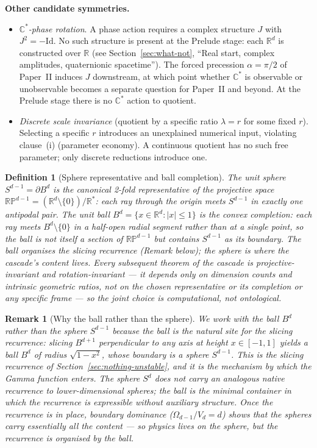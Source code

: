 \documentclass[11pt,a4paper]{article}
\newtheorem{definition}[theorem]{Definition}
\newtheorem{remark}[theorem]{Remark}
\begin{document}
\noindent\textbf{Other candidate symmetries.}
\begin{itemize}
\item \emph{$\mathbb{C}^*$-phase rotation}. A phase action requires a
complex structure $J$ with $J^2=-\mathrm{Id}$. No such structure is
present at the Prelude stage: each $\mathbb{R}^d$ is constructed over
$\mathbb{R}$ (see Section~\ref{sec:what-not}, ``Real start, complex
amplitudes, quaternionic spacetime''). The forced precession
$\alpha=\pi/2$ of Paper~II induces $J$ downstream, at which point
whether $\mathbb{C}^*$ is observable or unobservable becomes a
separate question for Paper~II and beyond. At the Prelude stage there
is no $\mathbb{C}^*$ action to quotient.
\item \emph{Discrete scale invariance} (quotient by a specific ratio
$\lambda = r$ for some fixed $r$). Selecting a specific $r$ introduces
an unexplained numerical input, violating clause~(i) (parameter
economy). A continuous quotient has no such free parameter; only
discrete reductions introduce one.
\end{itemize}

\begin{definition}[Sphere representative and ball completion]\label{def:ball}
The unit sphere $S^{d-1}=\partial B^d$ is the canonical 2-fold
representative of the projective space
$\mathbb{R}\mathbb{P}^{d-1}=(\mathbb{R}^d\setminus\{0\})/\mathbb{R}^*$:
each ray through the origin meets $S^{d-1}$ in exactly one antipodal
pair. The unit ball $B^d = \{x\in\mathbb{R}^d : |x|\leq 1\}$ is the
convex completion: each ray meets $B^d\setminus\{0\}$ in a half-open
radial segment rather than at a single point, so the ball is not
itself a section of $\mathbb{R}\mathbb{P}^{d-1}$ but contains
$S^{d-1}$ as its boundary. The ball organises the slicing recurrence
(Remark below); the sphere is where the cascade's content lives. Every
subsequent theorem of the cascade is projective-invariant and
rotation-invariant --- it depends only on dimension counts and intrinsic
geometric ratios, not on the chosen representative or its completion
or any specific frame --- so the joint choice is computational, not
ontological.
\end{definition}

\begin{remark}[Why the ball rather than the sphere]
We work with the ball $B^d$ rather than the sphere $S^{d-1}$ because
the ball is the natural site for the slicing recurrence: slicing
$B^{d+1}$ perpendicular to any axis at height $x\in[-1,1]$ yields a
ball $B^d$ of radius $\sqrt{1-x^2}$, whose boundary is a sphere
$S^{d-1}$. This is the slicing recurrence of
Section~\ref{sec:nothing-unstable}, and it is the mechanism by which
the Gamma function enters. The sphere $S^d$ does not carry an
analogous native recurrence to lower-dimensional spheres; the ball is
the minimal container in which the recurrence is expressible without
auxiliary structure. Once the recurrence is in place, boundary
dominance ($\Omega_{d-1}/V_d = d$) shows that the spheres carry
essentially all the content --- so physics lives on the sphere, but
the recurrence is organised by the ball.
\end{remark}
\end{document}
